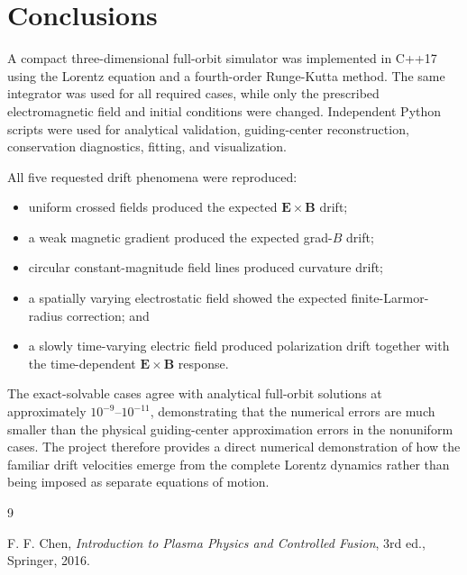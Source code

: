 \documentclass[11pt,a4paper]{article}
\newcommand{\vect}[1]{\boldsymbol{#1}}
\begin{document}
\section{Conclusions}

A compact three-dimensional full-orbit simulator was implemented in C++17 using the Lorentz equation and a fourth-order Runge-Kutta method. The same integrator was used for all required cases, while only the prescribed electromagnetic field and initial conditions were changed. Independent Python scripts were used for analytical validation, guiding-center reconstruction, conservation diagnostics, fitting, and visualization.

All five requested drift phenomena were reproduced:
\begin{itemize}
    \item uniform crossed fields produced the expected $\vect{E}\times\vect{B}$ drift;
    \item a weak magnetic gradient produced the expected grad-$B$ drift;
    \item circular constant-magnitude field lines produced curvature drift;
    \item a spatially varying electrostatic field showed the expected finite-Larmor-radius correction; and
    \item a slowly time-varying electric field produced polarization drift together with the time-dependent $\vect{E}\times\vect{B}$ response.
\end{itemize}

The exact-solvable cases agree with analytical full-orbit solutions at approximately $10^{-9}$--$10^{-11}$, demonstrating that the numerical errors are much smaller than the physical guiding-center approximation errors in the nonuniform cases. The project therefore provides a direct numerical demonstration of how the familiar drift velocities emerge from the complete Lorentz dynamics rather than being imposed as separate equations of motion.

\begin{thebibliography}{9}

F. F. Chen,
\textit{Introduction to Plasma Physics and Controlled Fusion},
3rd ed., Springer, 2016.

\end{thebibliography}
\end{document}
